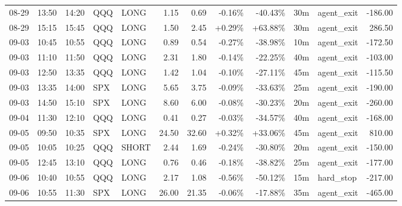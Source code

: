 \documentclass[11pt,a4paper,twoside]{article}
\begin{document}
\begin{center}
\begin{longtable}{>{\color{txtmain}}l l l l l r r r r r >{\color{txtmain}}l r}
08-29 & 13:50 & 14:20 & QQQ & LONG & 1.15 & 0.69 & \textcolor{lossred}{-0.16\%} & \textcolor{lossred}{-40.43\%} & 30m & agent\_exit & \textcolor{lossred}{-186.00} \\
08-29 & 15:15 & 15:45 & QQQ & LONG & 1.50 & 2.45 & \textcolor{wingreen}{+0.29\%} & \textcolor{wingreen}{+63.88\%} & 30m & agent\_exit & \textcolor{wingreen}{286.50} \\
09-03 & 10:45 & 10:55 & QQQ & LONG & 0.89 & 0.54 & \textcolor{lossred}{-0.27\%} & \textcolor{lossred}{-38.98\%} & 10m & agent\_exit & \textcolor{lossred}{-172.50} \\
09-03 & 11:10 & 11:50 & QQQ & LONG & 2.31 & 1.80 & \textcolor{lossred}{-0.14\%} & \textcolor{lossred}{-22.25\%} & 40m & agent\_exit & \textcolor{lossred}{-103.00} \\
09-03 & 12:50 & 13:35 & QQQ & LONG & 1.42 & 1.04 & \textcolor{lossred}{-0.10\%} & \textcolor{lossred}{-27.11\%} & 45m & agent\_exit & \textcolor{lossred}{-115.50} \\
09-03 & 13:35 & 14:00 & SPX & LONG & 5.65 & 3.75 & \textcolor{lossred}{-0.09\%} & \textcolor{lossred}{-33.63\%} & 25m & agent\_exit & \textcolor{lossred}{-190.00} \\
09-03 & 14:50 & 15:10 & SPX & LONG & 8.60 & 6.00 & \textcolor{lossred}{-0.08\%} & \textcolor{lossred}{-30.23\%} & 20m & agent\_exit & \textcolor{lossred}{-260.00} \\
09-04 & 11:30 & 12:10 & QQQ & LONG & 0.41 & 0.27 & \textcolor{lossred}{-0.03\%} & \textcolor{lossred}{-34.57\%} & 40m & agent\_exit & \textcolor{lossred}{-168.00} \\
09-05 & 09:50 & 10:35 & SPX & LONG & 24.50 & 32.60 & \textcolor{wingreen}{+0.32\%} & \textcolor{wingreen}{+33.06\%} & 45m & agent\_exit & \textcolor{wingreen}{810.00} \\
09-05 & 10:05 & 10:25 & QQQ & SHORT & 2.44 & 1.69 & \textcolor{lossred}{-0.24\%} & \textcolor{lossred}{-30.80\%} & 20m & agent\_exit & \textcolor{lossred}{-150.00} \\
09-05 & 12:45 & 13:10 & QQQ & LONG & 0.76 & 0.46 & \textcolor{lossred}{-0.18\%} & \textcolor{lossred}{-38.82\%} & 25m & agent\_exit & \textcolor{lossred}{-177.00} \\
09-06 & 10:40 & 10:55 & QQQ & LONG & 2.17 & 1.08 & \textcolor{lossred}{-0.56\%} & \textcolor{lossred}{-50.12\%} & 15m & hard\_stop & \textcolor{lossred}{-217.00} \\
09-06 & 10:55 & 11:30 & SPX & LONG & 26.00 & 21.35 & \textcolor{lossred}{-0.06\%} & \textcolor{lossred}{-17.88\%} & 35m & agent\_exit & \textcolor{lossred}{-465.00} \\

\end{longtable}
\end{center}
\end{document}
